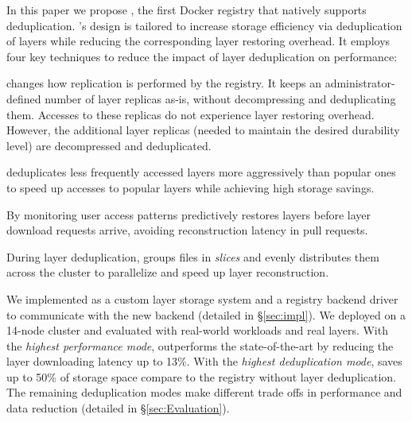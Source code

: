In this paper we propose \sysname, the first Docker registry that natively
supports deduplication.
%
\sysname's design is tailored to
increase storage efficiency via deduplication of layers while
reducing the corresponding layer restoring overhead.
%
It employs four key techniques to reduce
the impact of layer deduplication on performance: 
%
%
\begin{compactenumerate}
\item 
\sysname changes how replication is performed by the registry.
%
It keeps an administrator-defined
number of layer replicas as-is, without decompressing and deduplicating them.
%
Accesses to these replicas do not experience layer restoring overhead.
%
However, the additional layer replicas (needed
to maintain the desired durability level)
are decompressed and deduplicated.

\item \sysname deduplicates less frequently accessed layers more
aggressively than popular ones to speed up accesses to popular
layers while achieving high storage savings.
%
\item By monitoring user access patterns \sysname predictively
restores layers before layer download requests arrive,
avoiding reconstruction latency in pull requests.
%
\item During layer deduplication, \sysname groups files in \emph{slices} and evenly
distributes them across the cluster to parallelize and speed up layer reconstruction.
%
\end{compactenumerate}


We implemented \sysname as a custom layer storage system and
a registry backend driver to communicate
with the new backend (detailed in \S\ref{sec:impl}).
%
We deployed \sysname on a 14-node cluster and evaluated with real-world
workloads and real layers.
%
With the \emph{highest performance mode}, \sysname outperforms the
state-of-the-art by reducing the layer downloading latency up to 13\%.
%
With the \emph{highest deduplication mode}, \sysname saves up to 50\% of
storage space compare to the registry without layer deduplication.
%
%
The remaining deduplication modes make different trade offs in performance and
data reduction (detailed in \S\ref{sec:Evaluation}).

%
